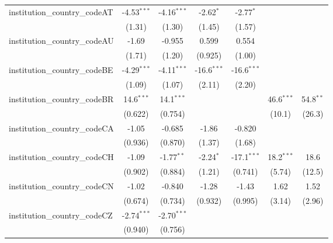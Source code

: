 \begin{tabular}{lcccccc}
   institution\_country\_codeAT          & -4.53$^{***}$ & -4.16$^{***}$ & -2.62$^{*}$   & -2.77$^{*}$   &               &   \\   
                                         & (1.31)        & (1.30)        & (1.45)        & (1.57)        &               &   \\   
   institution\_country\_codeAU          & -1.69         & -0.955        & 0.599         & 0.554         &               &   \\   
                                         & (1.71)        & (1.20)        & (0.925)       & (1.00)        &               &   \\   
   institution\_country\_codeBE          & -4.29$^{***}$ & -4.11$^{***}$ & -16.6$^{***}$ & -16.6$^{***}$ &               &   \\   
                                         & (1.09)        & (1.07)        & (2.11)        & (2.20)        &               &   \\   
   institution\_country\_codeBR          & 14.6$^{***}$  & 14.1$^{***}$  &               &               & 46.6$^{***}$  & 54.8$^{**}$\\   
                                         & (0.622)       & (0.754)       &               &               & (10.1)        & (26.3)\\   
   institution\_country\_codeCA          & -1.05         & -0.685        & -1.86         & -0.820        &               &   \\   
                                         & (0.936)       & (0.870)       & (1.37)        & (1.68)        &               &   \\   
   institution\_country\_codeCH          & -1.09         & -1.77$^{**}$  & -2.24$^{*}$   & -17.1$^{***}$ & 18.2$^{***}$  & 18.6\\   
                                         & (0.902)       & (0.884)       & (1.21)        & (0.741)       & (5.74)        & (12.5)\\   
   institution\_country\_codeCN          & -1.02         & -0.840        & -1.28         & -1.43         & 1.62          & 1.52\\   
                                         & (0.674)       & (0.734)       & (0.932)       & (0.995)       & (3.14)        & (2.96)\\   
   institution\_country\_codeCZ          & -2.74$^{***}$ & -2.70$^{***}$ &               &               &               &   \\   
                                         & (0.940)       & (0.756)       &               &               &               &   \\   

\end{tabular}
